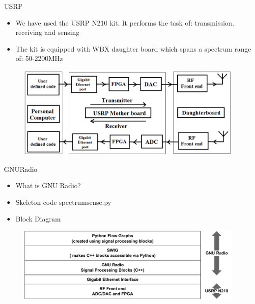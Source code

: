 \documentclass{beamer}
\begin{document}
  \begin{frame}{USRP}
    \begin{itemize}
      \item We have used the USRP N210 kit. It performs the task of: transmission, receiving and sensing
      \item The kit is equipped with WBX daughter board which spans a spectrum range of: 50-2200MHz
    \end{itemize}
    \begin{figure}
      \centering
      \includegraphics[width=\linewidth]{img/usrpBlock}
    \end{figure}
  \end{frame}
  
  \begin{frame}{GNURadio}
    \begin{itemize}
        \item What is GNU Radio?
        \item Skeleton code spectrumsense.py
        \item Block Diagram
    \end{itemize}
    \begin{figure}
      \centering
      \includegraphics[width=\linewidth]{img/gnuradio_architecture}
    \end{figure}
  \end{frame}
\end{document}
